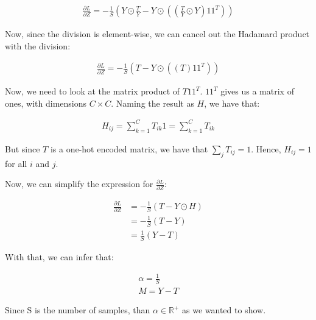 \documentclass{article}
\begin{document}
\begin{align*}
    \frac{\partial L}{\partial Z} = - \frac{1}{S} \left( Y \odot \frac{T}{Y} - Y \odot \left( \left( \frac{T}{Y} \odot Y \right) 1 1^T \right) \right)
\end{align*}

Now, since the division is element-wise, we can cancel out the Hadamard product with the division:

\begin{align*}
    \frac{\partial L}{\partial Z} = - \frac{1}{S} \left( T - Y \odot \left( \left( T \right) 1 1^T \right) \right)
\end{align*}

Now, we need to look at the matrix product of $T 1 1^T$. $1 1^T$ gives us a matrix of ones, with dimensions $C \times C$.
Naming the result as $H$, we have that: 

\begin{align*}
    H_{ij} = \sum_{k=1}^{C} T_{ik} 1 = \sum_{k=1}^{C} T_{ik}
\end{align*}

But since $T$ is a one-hot encoded matrix, we have that $\sum_{j} T_{ij} = 1$. Hence, $H_{ij} = 1$ for all $i$ and $j$.

Now, we can simplify the expression for $\frac{\partial L}{\partial Z}$:

\begin{align*}
    \frac{\partial L}{\partial Z} &= - \frac{1}{S} \left( T - Y \odot H \right) \\
    &= - \frac{1}{S} \left( T - Y \right) \\
    &= \frac{1}{S} \left( Y - T \right)
\end{align*}

With that, we can infer that: 

\begin{align*}
    \alpha = \frac{1}{S} \\
    M = Y - T
\end{align*}

Since S is the number of samples, than $\alpha \in \mathbb{R}^{+}$ as we wanted to show.
\end{document}
